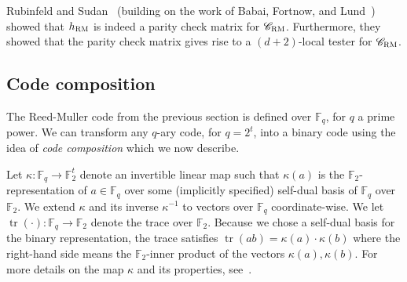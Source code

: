 \documentclass[11pt]{article}
\newtheorem{theorem}{Theorem}[section]
\theoremstyle{definition}
\newcommand{\code}{\mathscr{C}}
\newcommand{\F}{\ensuremath{\mathbb{F}}}
\newcommand{\mX}{\ensuremath{\mathcal{X}}}
\newcommand{\RM}{\ensuremath{\textsc{RM}}}
\DeclareMathOperator{\poly}{poly}
\newcommand{\eps}{\varepsilon}
\DeclareMathOperator{\tr}{tr}
\begin{document}
Rubinfeld and Sudan~\cite{rubinfeld1996robust} (building on the work of Babai, Fortnow, and Lund~\cite{babai1991non}) showed that $h_{\RM}$ is indeed a parity check matrix for $\code_{\RM}$. Furthermore, they showed that the parity check matrix gives rise to a $(d+2)$-local tester for $\code_{\RM}$. 




\subsection{Code composition}
\label{sec:code-comp}

 The Reed-Muller code from the previous section is defined over $\F_q$, for $q$ a prime power. We can transform any $q$-ary code, for $q=2^t$, into a binary code using the idea of \emph{code composition} which we now describe. 


Let $\kappa: \F_q \to \F_2^t$ denote an invertible linear map such that $\kappa(a)$ is the $\F_2$-representation of $a \in \F_q$ over some (implicitly specified) self-dual basis of $\F_q$ over $\F_2$. We extend $\kappa$ and its inverse $\kappa^{-1}$ to vectors over $\F_q$ coordinate-wise. We let $\tr(\cdot):\F_q\to\F_2$ denote the trace over $\F_2$. Because we chose a self-dual basis for the binary representation, the trace satisfies $\tr(ab)=\kappa(a)\cdot\kappa(b)$  where the right-hand side means the $\F_2$-inner product of the vectors $\kappa(a), \kappa(b)$. For more details on the map $\kappa$ and its properties, see~\cite[Section 3.3]{ji2020mip}.
\end{document}
